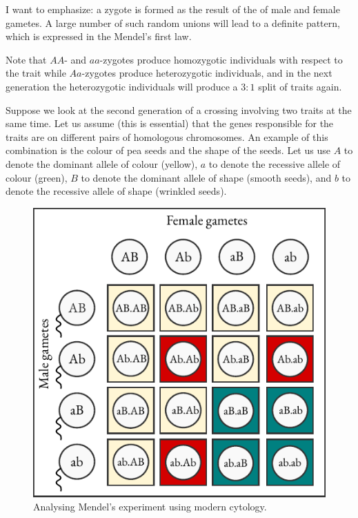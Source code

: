 I want to emphasize: a zygote is formed as the result of the   of male and female gametes. A large number of such random
unions will   lead to a definite pattern, which is expressed in the Mendel's first law.

Note that $AA$- and $aa$-zygotes produce homozygotic individuals with
respect to the trait while $Aa$-zygotes produce heterozygotic individuals,
and in the next generation the heterozygotic individuals will produce
a $3:1$ split of traits again.

 Suppose we look at the second generation of a crossing involving two traits at the same time.
Let us assume (this is essential) that the genes responsible for the traits
are on different pairs of homologous chromosomes. An example of this
combination is the colour of pea seeds and the shape of the seeds. Let
us use $A$ to denote the dominant allele of colour (yellow), $a$ to denote
the recessive allele of colour (green), $B$ to denote the dominant allele of
shape (smooth seeds), and $b$ to denote the recessive allele of shape
(wrinkled seeds).

\begin{figure}[!ht]
\centering
\includegraphics[width=0.75\tfwidth]{figures/genes2.pdf}
\caption{Analysing Mendel's experiment using modern cytology.\label{genes2}}
\end{figure}


